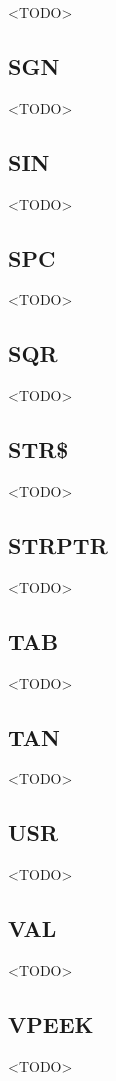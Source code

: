 <TODO>

\subsection{SGN}

<TODO>

\subsection{SIN}

<TODO>

\subsection{SPC}

<TODO>

\subsection{SQR}

<TODO>

\subsection{STR\$}

<TODO>

\subsection{STRPTR}

<TODO>

\subsection{TAB}

<TODO>

\subsection{TAN}

<TODO>

\subsection{USR}

<TODO>

\subsection{VAL}

<TODO>

\subsection{VPEEK}

<TODO>

